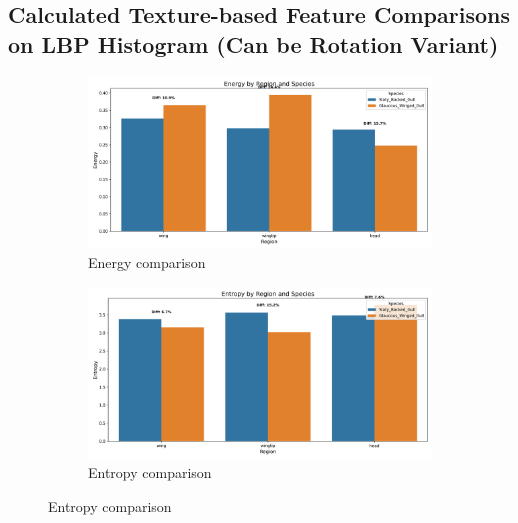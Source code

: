 \documentclass[a4paper,12pt]{report}
\begin{document}
\subsection{Calculated Texture-based Feature Comparisons on LBP Histogram (Can be Rotation Variant)}
\begin{figure}[H]
    \centering
    \begin{subfigure}[t]{0.48\textwidth}
        \centering
        \includegraphics[width=\textwidth]{images/appendix/Original/energy_comparison.png}
        \caption{Energy comparison}
    \end{subfigure}
    \hfill
    \begin{subfigure}[t]{0.48\textwidth}
        \centering
        \includegraphics[width=\textwidth]{images/appendix/Original/entropy_comparison.png}
        \caption{Entropy comparison}
    \end{subfigure}
    
    \vspace{0.5cm}
    

\end{figure}
\end{document}
